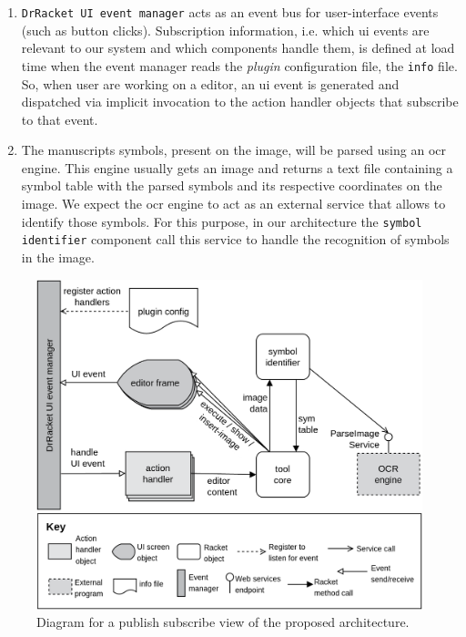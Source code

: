 \begin{enumerate}
	\item \texttt{DrRacket UI event manager} acts as an event bus for user-interface events (such as button clicks). Subscription information, i.e. which \ac{ui} events are relevant to our system and which components handle them, is defined at load time when the event manager reads the \textit{plugin} configuration file, the \texttt{info} file. So, when user are working on a editor, an \ac{ui} event is generated and dispatched via implicit invocation to the action handler objects that subscribe to that event.

	\item The manuscripts symbols, present on the image, will be parsed using an \ac{ocr} engine. This engine usually gets an image and returns a text file containing a symbol table with the parsed symbols and its respective coordinates on the image. We expect the \ac{ocr} engine to act as an external service that allows to identify those symbols. For this purpose, in our architecture the \texttt{symbol identifier} component call this service to handle the recognition of symbols in the image.
\end{enumerate}

\begin{figure}[htb]
 \vspace{-15pt}
	\centering
	\includegraphics[scale=0.19]{img/solution}
	\vspace{-10pt}
	\caption{Diagram for a publish subscribe view of the proposed architecture.}
	\label{fig:solution}
 \vspace{-10pt}
\end{figure}


